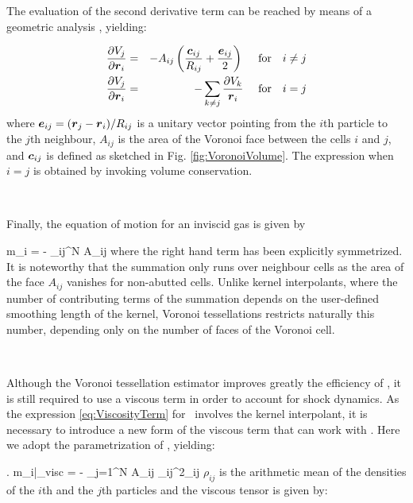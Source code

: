 \documentclass[a4,useAMS,usenatbib,usegraphicx,12pt]{article}
\begin{document}
The evaluation of the second derivative term can be reached by means of a 
geometric analysis \citep{Serrano01}, yielding:

\begin{eqnarray}
\nonumber{}
\frac{\partial V_j}{\partial \boldsymbol{ r }_i} &=& -A_{ij}\left(  \frac{\boldsymbol{ c }_{ij}}{R_{ij}}
+ \frac{\boldsymbol{ e }_{ij}}{2}  \right) \ \ \ \ \mbox{for}\ \ \ i\neq j \\
\label{VoronoiVolume}
\frac{\partial V_j}{\partial \boldsymbol{ r }_i} &=& -\sum_{k\neq j}\frac{\partial V_k}{\boldsymbol{ r }_i} \ \ \ \ \mbox{for}\ \ \ i=j
\end{eqnarray}
where $\boldsymbol{ e }_{ij} = (\boldsymbol{ r }_j - \boldsymbol{ r }_i )/R_{ij}$ is a unitary vector 
pointing from the $i$th particle to the $j$th neighbour, $A_{ij}$ is the area 
of the Voronoi face between the cells $i$ and $j$, and $\boldsymbol{ c }_{ij}$ is defined
as sketched in Fig. \ref{fig:VoronoiVolume}. The expression when $i=j$ is 
obtained by invoking volume conservation.

\

Finally, the equation of motion for an inviscid gas is given by

{ m_i  = - \sum_{i\neq j}^N A_{ij} }
where the right hand term has been explicitly symmetrized. It is noteworthy that
the summation only runs over neighbour cells as the area of the face $A_{ij}$ 
vanishes for non-abutted cells. Unlike kernel interpolants, where the number of
contributing terms of the summation depends on the user-defined smoothing 
length of the kernel, Voronoi tessellations restricts naturally this number, 
depending only on the number of faces of the Voronoi cell.

\

Although the Voronoi tessellation estimator improves greatly the efficiency of 
\SPH, it is still required to use a viscous term in order to account for shock
dynamics. As the expression \ref{eq:ViscosityTerm} for \SPH\ involves the kernel
interpolant, it is necessary to introduce a new form of the viscous term that 
can work with \VPH. Here we adopt the parametrization of \citet{Hess10}, 
yielding:

{ \left. m_i\right|_{\mbox{\footnotesize visc}} =
- \sum_{j=1}^N A_{ij} {\rho}_{ij}^2\Pi_{ij} }
$\rho_{ij}$ is the arithmetic mean of the densities of the $i$th and the $j$th 
particles and the viscous tensor is given by:
\end{document}
